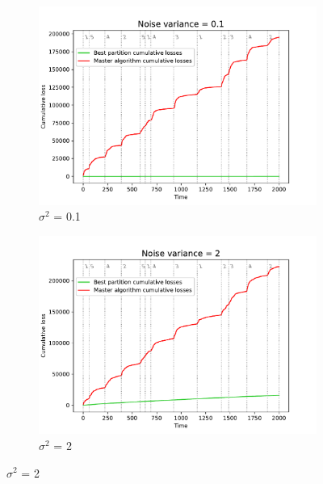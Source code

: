 \documentclass[12pt, twoside]{article}
\begin{document}
\begin{figure}[htb]
    \centering %
\begin{subfigure}{0.49\textwidth}
  \includegraphics[width=\linewidth]{noise_0.1}
  \caption{$\sigma^2$ = 0.1}
  \label{fig:n_1}
\end{subfigure}\hfil %
\begin{subfigure}{0.49\textwidth}
  \includegraphics[width=\linewidth]{noise_2}
  \caption{$\sigma^2$ = 2}
  \label{fig:n_2}
\end{subfigure}\hfil %


\end{figure}
\end{document}
